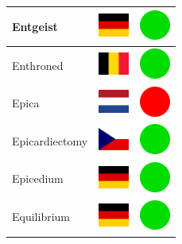 \documentclass[12pt, a4paper, twoside]{report}
\begin{document}
\begin{center}
\begin{longtable}{|p{5cm}|p{2cm}|p{2cm}|}
 Entgeist                                                   & \includegraphics[width=1cm]{../img/flags/de} &   \includegraphics[width=1cm]{../likes/y} \\ \hline
 Enthroned                                                  & \includegraphics[width=1cm]{../img/flags/be} &   \includegraphics[width=1cm]{../likes/y} \\ \hline
 Epica                                                      & \includegraphics[width=1cm]{../img/flags/nl} &   \includegraphics[width=1cm]{../likes/n} \\ \hline
 Epicardiectomy                                             & \includegraphics[width=1cm]{../img/flags/cz} &   \includegraphics[width=1cm]{../likes/y} \\ \hline
 Epicedium                                                  & \includegraphics[width=1cm]{../img/flags/de} &   \includegraphics[width=1cm]{../likes/y} \\ \hline
 Equilibrium                                                & \includegraphics[width=1cm]{../img/flags/de} &   \includegraphics[width=1cm]{../likes/y} \\ \hline

\end{longtable}
\end{center}
\end{document}
